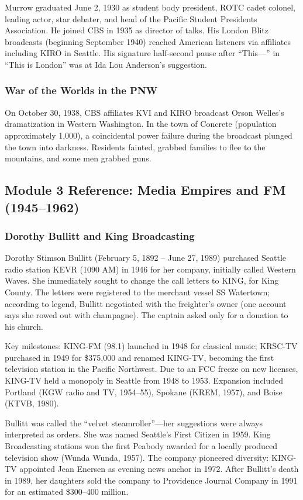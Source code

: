 \documentclass[11pt,letterpaper]{article}
\begin{document}
Murrow graduated June 2, 1930 as student body president, ROTC cadet colonel, leading actor, star debater, and head of the Pacific Student Presidents Association. He joined CBS in 1935 as director of talks. His London Blitz broadcasts (beginning September 1940) reached American listeners via affiliates including KIRO in Seattle. His signature half-second pause after ``This---'' in ``This is London'' was at Ida Lou Anderson's suggestion.

\subsubsection{War of the Worlds in the PNW}

On October 30, 1938, CBS affiliates KVI and KIRO broadcast Orson Welles's dramatization in Western Washington. In the town of Concrete (population approximately 1,000), a coincidental power failure during the broadcast plunged the town into darkness. Residents fainted, grabbed families to flee to the mountains, and some men grabbed guns.

\subsection{Module 3 Reference: Media Empires and FM (1945--1962)}

\subsubsection{Dorothy Bullitt and King Broadcasting}

Dorothy Stimson Bullitt (February 5, 1892 -- June 27, 1989) purchased Seattle radio station KEVR (1090 AM) in 1946 for her company, initially called Western Waves. She immediately sought to change the call letters to KING, for King County. The letters were registered to the merchant vessel SS Watertown; according to legend, Bullitt negotiated with the freighter's owner (one account says she rowed out with champagne). The captain asked only for a donation to his church.

Key milestones: KING-FM (98.1) launched in 1948 for classical music; KRSC-TV purchased in 1949 for \$375,000 and renamed KING-TV, becoming the first television station in the Pacific Northwest. Due to an FCC freeze on new licenses, KING-TV held a monopoly in Seattle from 1948 to 1953. Expansion included Portland (KGW radio and TV, 1954--55), Spokane (KREM, 1957), and Boise (KTVB, 1980).

Bullitt was called the ``velvet steamroller''---her suggestions were always interpreted as orders. She was named Seattle's First Citizen in 1959. King Broadcasting stations won the first Peabody awarded for a locally produced television show (Wunda Wunda, 1957). The company pioneered diversity: KING-TV appointed Jean Enersen as evening news anchor in 1972. After Bullitt's death in 1989, her daughters sold the company to Providence Journal Company in 1991 for an estimated \$300--400 million.
\end{document}
